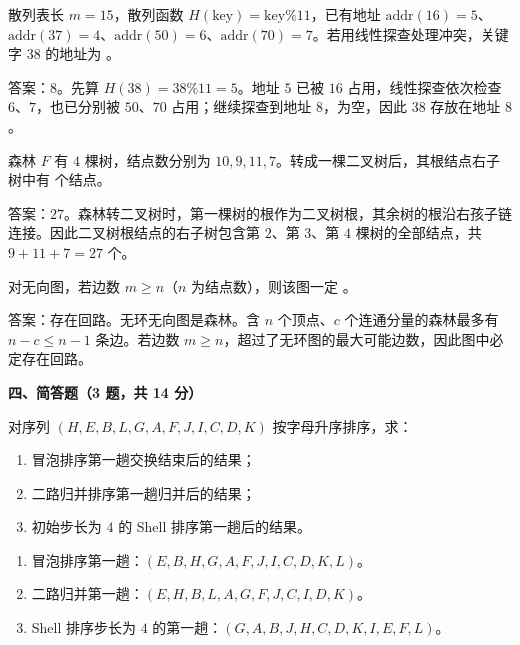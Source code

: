 \begin{question}
散列表长 $m=15$，散列函数 $H(\mathrm{key})=\mathrm{key}\%11$，已有地址 $\mathrm{addr}(16)=5$、$\mathrm{addr}(37)=4$、$\mathrm{addr}(50)=6$、$\mathrm{addr}(70)=7$。若用线性探查处理冲突，关键字 $38$ 的地址为 \blank。
\begin{solution}
答案：$8$。先算 $H(38)=38\%11=5$。地址 $5$ 已被 $16$ 占用，线性探查依次检查 $6$、$7$，也已分别被 $50$、$70$ 占用；继续探查到地址 $8$，为空，因此 $38$ 存放在地址 $8$。
\end{solution}
\end{question}

\begin{question}
森林 $F$ 有 $4$ 棵树，结点数分别为 $10,9,11,7$。转成一棵二叉树后，其根结点右子树中有 \blank 个结点。
\begin{solution}
答案：$27$。森林转二叉树时，第一棵树的根作为二叉树根，其余树的根沿右孩子链连接。因此二叉树根结点的右子树包含第 $2$、第 $3$、第 $4$ 棵树的全部结点，共 $9+11+7=27$ 个。
\end{solution}
\end{question}

\begin{question}
对无向图，若边数 $m\ge n$（$n$ 为结点数），则该图一定 \blank。
\begin{solution}
答案：存在回路。无环无向图是森林。含 $n$ 个顶点、$c$ 个连通分量的森林最多有 $n-c\le n-1$ 条边。若边数 $m\ge n$，超过了无环图的最大可能边数，因此图中必定存在回路。
\end{solution}
\end{question}

\textbf{四、简答题（3 题，共 14 分）}
\begin{question}
对序列 $(H,E,B,L,G,A,F,J,I,C,D,K)$ 按字母升序排序，求：
\begin{enumerate}
  \item 冒泡排序第一趟交换结束后的结果；
  \item 二路归并排序第一趟归并后的结果；
  \item 初始步长为 $4$ 的 Shell 排序第一趟后的结果。
\end{enumerate}
\begin{solution}
\begin{enumerate}
  \item 冒泡排序第一趟：$(E,B,H,G,A,F,J,I,C,D,K,L)$。
  \item 二路归并第一趟：$(E,H,B,L,A,G,F,J,C,I,D,K)$。
  \item Shell 排序步长为 $4$ 的第一趟：$(G,A,B,J,H,C,D,K,I,E,F,L)$。
\end{enumerate}
\end{solution}
\end{question}

